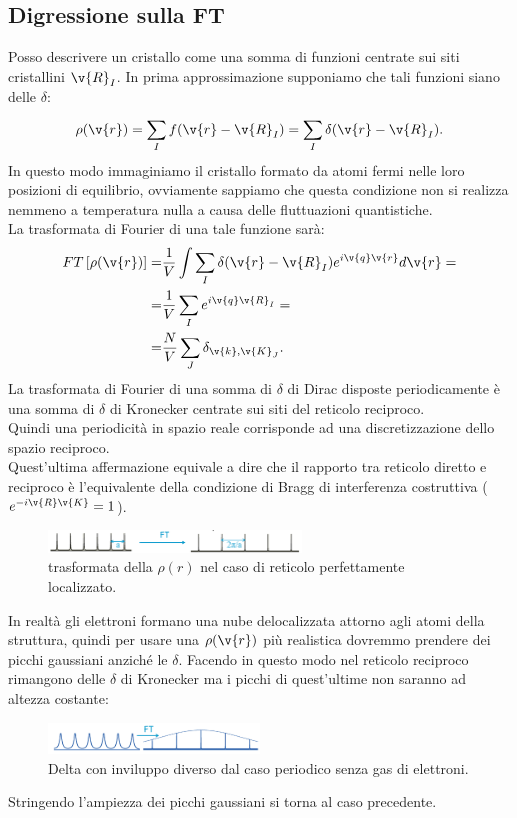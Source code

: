 \subsection{Digressione sulla FT}
\label{subsec:Digressione sulla FT}
Posso descrivere un cristallo come una somma di funzioni centrate sui siti cristallini $\v{R}_I$. In prima approssimazione supponiamo che tali funzioni siano delle $\delta$:
\[
	\rho (\v{r}) = \sum_{I}^{} f(\v{r}-\v{R}_I) = \sum_{I}^{} \delta(\v{r}-\v{R}_I)
.\] 
In questo modo immaginiamo il cristallo formato da atomi fermi nelle loro posizioni di equilibrio, ovviamente sappiamo che questa condizione non si realizza nemmeno a temperatura nulla a causa delle fluttuazioni quantistiche.\\
La trasformata di Fourier di una tale funzione sarà:
\[\begin{aligned}
	FT\left[ \rho (\v{r}) \right] 
	=&
	\frac{1}{V}\int \sum_{I}^{} \delta(\v{r}-\v{R}_I)e^{i \v{q}\v{r}}d \v{r} =\\
	=&
	\frac{1}{V}\sum_{I}^{} e^{i \v{q}\v{R}_I} =\\
	=&
	\frac{N}{V}\sum_{J}^{} \delta_{\v{k},\v{K}_J}
.\end{aligned}\]
La trasformata di Fourier di una somma di $\delta$ di Dirac disposte periodicamente è una somma di $\delta$ di Kronecker centrate sui siti del reticolo reciproco.\\
Quindi una periodicità in spazio reale corrisponde ad una discretizzazione dello spazio reciproco. \\
Quest'ultima affermazione equivale a dire che il rapporto tra reticolo diretto e reciproco è l'equivalente della condizione di Bragg di interferenza costruttiva ($e^{-i \v{R}\v{K}} = 1$).
\begin{figure}[H]
	\centering
	\includegraphics[width=0.6\textwidth]{figures/reticolo-localizzato.png}
	\caption{trasformata della $\rho (r)$ nel caso di reticolo perfettamente localizzato.}
	\label{fig:}
\end{figure}
\noindent
In realtà gli elettroni formano una nube delocalizzata attorno agli atomi della struttura, quindi per usare una $\rho (\v{r})$ più realistica dovremmo prendere dei picchi gaussiani anziché le $\delta$. Facendo in questo modo nel reticolo reciproco rimangono delle $\delta$ di Kronecker ma i picchi di quest'ultime non saranno ad altezza costante:
\begin{figure}[H]
	\centering
	\includegraphics[width=0.5\textwidth]{figures/delta-smussate.png}
	\caption{Delta con inviluppo diverso dal caso periodico senza gas di elettroni.}
	\label{fig:fi}
\end{figure}
\noindent
Stringendo l'ampiezza dei picchi gaussiani si torna al caso precedente.
